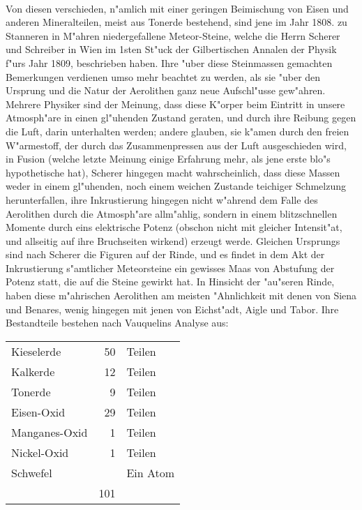 \documentclass[a4paper, 11pt, oneside, polutonikogreek, german]{article}
\begin{document}
\paragraph{}
Von diesen verschieden, n"amlich mit einer geringen Beimischung von Eisen und anderen Mineralteilen, meist aus Tonerde bestehend, sind jene im Jahr 1808. zu Stanneren in M"ahren niedergefallene Meteor-Steine, welche die Herrn Scherer und Schreiber in Wien im 1sten St"uck der Gilbertischen Annalen der Physik f"urs Jahr 1809, beschrieben haben. Ihre "uber diese Steinmassen gemachten Bemerkungen verdienen umso mehr beachtet zu werden, als sie "uber den Ursprung und die Natur der Aerolithen ganz neue Aufschl"usse gew"ahren. Mehrere Physiker sind der Meinung, dass diese K"orper beim Eintritt in unsere Atmosph"are in einen gl"uhenden Zustand geraten, und durch ihre Reibung gegen die Luft, darin unterhalten werden; andere glauben, sie k"amen durch den freien W"armestoff, der durch das Zusammenpressen aus der Luft ausgeschieden wird, in Fusion (welche letzte Meinung einige Erfahrung mehr, als jene erste blo"s hypothetische hat), Scherer hingegen macht wahrscheinlich, dass diese Massen weder in einem gl"uhenden, noch einem weichen Zustande teichiger Schmelzung herunterfallen, ihre Inkrustierung hingegen nicht w"ahrend dem Falle des Aerolithen durch die Atmosph"are allm"ahlig, sondern in einem blitzschnellen Momente durch eins elektrische Potenz (obschon nicht mit gleicher Intensit"at, und allseitig auf ihre Bruchseiten wirkend) erzeugt werde. Gleichen Ursprungs sind nach Scherer die Figuren auf der Rinde, und es findet in dem Akt der Inkrustierung s"amtlicher Meteorsteine ein gewisses Maas von Abstufung der Potenz statt, die auf die Steine gewirkt hat. In Hinsicht der "au"seren Rinde, haben diese m"ahrischen Aerolithen am meisten "Ahnlichkeit mit denen von Siena und Benares, wenig hingegen mit jenen von Eichst"adt, Aigle und Tabor. Ihre Bestandteile bestehen nach Vauquelins Analyse aus:
\begin{table}[H]
    \centering
    \frakfamily
    \Large
    \begin{tabular}{l r l}
        Kieselerde & 50 & Teilen \\
        Kalkerde & 12 & Teilen \\
        Tonerde & 9 & Teilen \\
        Eisen-Oxid & 29 & Teilen \\
        Manganes-Oxid & 1 & Teilen \\
        Nickel-Oxid & 1 & Teilen \\
        Schwefel & ~ & Ein Atom \\ \hline
         ~ & 101 & ~ \\ 
    \end{tabular}
\end{table}
\end{document}

